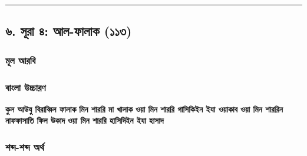 \medskip\hrule\medskip

\subsection*{৬. সূরা ৪: আল-ফালাক (১১৩)}

\subsubsection*{মূল আরবি}
\begin{center}\end{center}
\begin{center}\end{center}
\begin{center}\end{center}
\begin{center}\end{center}
\begin{center}\end{center}

\subsubsection*{বাংলা উচ্চারণ}
\textbf{কুল আউযু বিরাব্বিল ফালাক}
\textbf{মিন শাররি মা খালাক}
\textbf{ওয়া মিন শাররি গাসিকিইন ইযা ওয়াকাব}
\textbf{ওয়া মিন শাররিন নাফফাসাতি ফিল উকাদ}
\textbf{ওয়া মিন শাররি হাসিদিইন ইযা হাসাদ}

\subsubsection*{শব্দ-শব্দ অর্থ}

